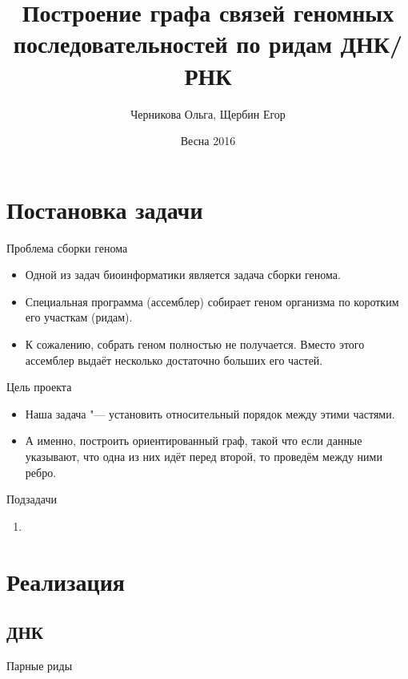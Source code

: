\documentclass{beamer}
\title[Граф по ридам ДНК/РНК]{Построение графа связей геномных последовательностей по ридам ДНК/РНК}
\author{Черникова Ольга, Щербин Егор}
\institute{СПб АУ РАН}
\date{Весна 2016}
\begin{document}
\begin{frame}
	\titlepage
\end{frame}

\section{Постановка задачи}

\begin{frame}[t]{Проблема сборки генома}
    \begin{itemize}
    \item
        Одной из задач биоинформатики является задача сборки генома.
    \item
        Специальная программа (ассемблер) собирает геном организма по коротким
        его участкам (ридам).
    \item
        К сожалению, собрать геном полностью не получается. Вместо этого
        ассемблер выдаёт несколько достаточно больших его частей.
    \end{itemize}
\end{frame}

\begin{frame}[t]{Цель проекта}
    \begin{itemize}
    \item
        Наша задача "--- установить относительный порядок между этими частями.
    \item
        А именно, построить ориентированный граф, такой что если данные 
        указывают, что одна из них идёт перед второй, то проведём между ними 
        ребро.
    \end{itemize}
\end{frame}

\begin{frame}[t]{Подзадачи}
	\begin{enumerate}
    \item
        
	\end{enumerate}
\end{frame}

\section{Реализация}
\subsection{ДНК}

\begin{frame}[t]{Парные риды}
\end{frame}
\end{document}
